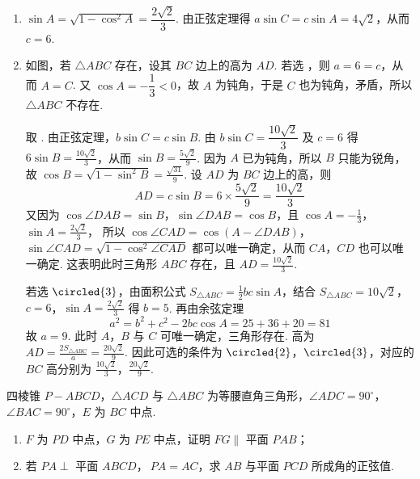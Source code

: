 \documentclass[UTF8,a4paper,oneside,11pt]{ctexbook}
\begin{document}
\begin{solution}
\begin{enumerate}
\item \(\sin A=\sqrt{1-\cos^2A}=\dfrac{2\sqrt2}{3}\). 由正弦定理得 \(a\sin C=c\sin A=4\sqrt2\)，从而 \(c=6\).

\item 如图，若 \(\triangle ABC\) 存在，设其 \(BC\) 边上的高为 \(AD\).
若选 ，则 \(a=6=c\)，从而 \(A=C\). 又 \(\cos A=-\dfrac13<0\)，故 \(A\) 为钝角，于是 \(C\) 也为钝角，矛盾，所以 \(\triangle ABC\) 不存在.

取 . 由正弦定理，\(b\sin C=c\sin B\). 由 \(b\sin C=\dfrac{10\sqrt2}{3}\) 及 \(c=6\) 得 \(6\sin B=\frac{10\sqrt2}{3}\)，从而 \(\sin B=\frac{5\sqrt2}{9}\). 因为 \(A\) 已为钝角，所以 \(B\) 只能为锐角，故 \(\cos B=\sqrt{1-\sin^2 B}=\frac{\sqrt{31}}{9}\).
设 \(AD\) 为 \(BC\) 边上的高，则
\[
AD=c\sin B=6\times\frac{5\sqrt2}{9}=\frac{10\sqrt2}{3}
\]
又因为 \(\cos\angle DAB=\sin B\)，\(\sin\angle DAB=\cos B\)，且 \(\cos A=-\frac13\)，\(\sin A=\frac{2\sqrt2}{3}\)，
所以 \(\cos\angle CAD=\cos\left( A-\angle DAB \right)\)，\(\sin\angle CAD=\sqrt{1-\cos^2\angle CAD}\) 都可以唯一确定，从而 \(CA\)，\(CD\) 也可以唯一确定. 这表明此时三角形 \(ABC\) 存在，且
\(AD=\frac{10\sqrt2}{3}\).

若选 \(\circled{3}\)，由面积公式 \(S_{\triangle ABC}=\frac12 bc\sin A\)，结合 \(S_{\triangle ABC}=10\sqrt2\)，\(c=6\)，\(\sin A=\frac{2\sqrt2}{3}\) 得 \(b=5\). 再由余弦定理
\[
a^2=b^2+c^2-2bc\cos A=25+36+20=81
\]
故 \(a=9\). 此时 \(A\)，\(B\) 与 \(C\) 可唯一确定，三角形存在. 高为
\(AD=\frac{2S_{\triangle ABC}}a=\frac{20\sqrt2}{9}\).
因此可选的条件为 \(\circled{2}\)，\(\circled{3}\)，对应的 \(BC\) 高分别为 \(\frac{10\sqrt2}{3}\)，\(\frac{20\sqrt2}{9}\).
\end{enumerate}
\end{solution}

\begin{problem}
四棱锥 \(P-ABCD\)，\(\triangle ACD\) 与 \(\triangle ABC\) 为等腰直角三角形，\(\angle ADC=90^\circ\)，\(\angle BAC=90^\circ\)，\(E\) 为 \(BC\) 中点.

\begin{enumerate}
\item \(F\) 为 \(PD\) 中点，\(G\) 为 \(PE\) 中点，证明 \(FG\parallel\) 平面 \(PAB\)；

\item 若 \(PA\perp\) 平面 \(ABCD\)，\(\ PA=AC\)，求 \(AB\) 与平面 \(PCD\) 所成角的正弦值.
\end{enumerate}
\end{problem}
\end{document}
